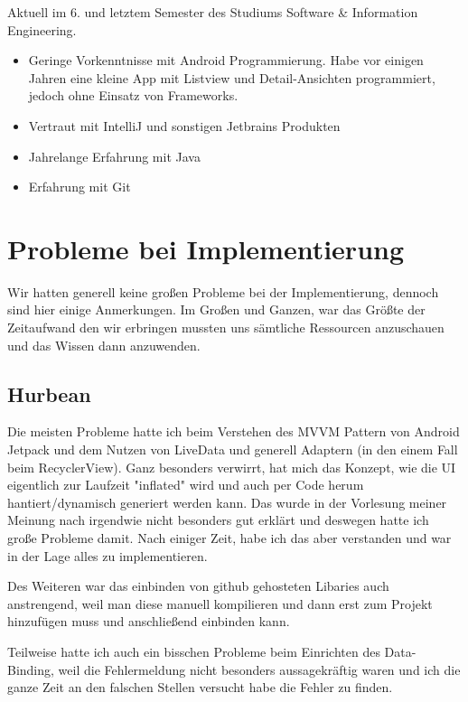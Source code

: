 \documentclass{mrtrash}
\begin{document}
Aktuell im 6. und letztem Semester des Studiums Software \& Information Engineering.

\begin{itemize}
    \item Geringe Vorkenntnisse mit Android Programmierung. Habe vor einigen Jahren eine kleine App mit Listview und Detail-Ansichten programmiert, jedoch ohne Einsatz von Frameworks.
    \item Vertraut mit IntelliJ und sonstigen Jetbrains Produkten
    \item Jahrelange Erfahrung mit Java
    \item Erfahrung mit Git
\end{itemize}

\begin{minipage}[t]{\textwidth}
    \centering
\end{minipage}

\section{Probleme bei Implementierung}

Wir hatten generell keine großen Probleme bei der Implementierung, dennoch sind hier einige Anmerkungen. Im Großen und Ganzen, war das Größte der Zeitaufwand den wir erbringen mussten uns sämtliche Ressourcen anzuschauen und das Wissen dann anzuwenden.

\subsection{Hurbean}

Die meisten Probleme hatte ich beim Verstehen des MVVM Pattern von Android Jetpack und dem Nutzen von LiveData und generell Adaptern (in den einem Fall beim RecyclerView). Ganz besonders verwirrt, hat mich das Konzept, wie die UI eigentlich zur Laufzeit "inflated" wird und auch per Code herum hantiert/dynamisch generiert werden kann. Das wurde in der Vorlesung meiner Meinung nach irgendwie nicht besonders gut erklärt und deswegen hatte ich große Probleme damit. Nach einiger Zeit, habe ich das aber verstanden und war in der Lage alles zu implementieren.

Des Weiteren war das einbinden von github gehosteten Libaries auch anstrengend, weil man diese manuell kompilieren und dann erst zum Projekt hinzufügen muss und anschließend einbinden kann.

Teilweise hatte ich auch ein bisschen Probleme beim Einrichten des Data-Binding, weil die Fehlermeldung nicht besonders aussagekräftig waren und ich die ganze Zeit an den falschen Stellen versucht habe die Fehler zu finden.
\end{document}
